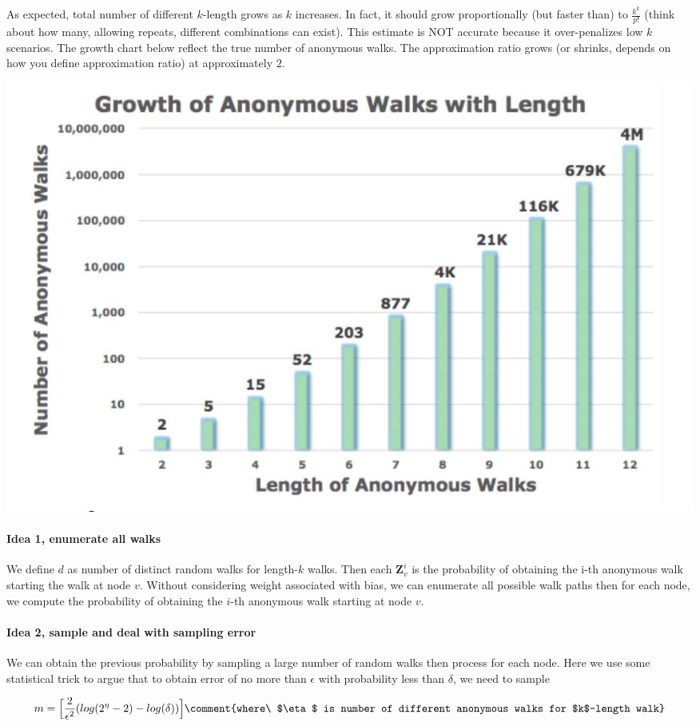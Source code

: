 As expected, total number of different $k$-length grows as $k$ increases. In fact, it should grow proportionally (but faster than) to $\frac{k^k}{p!}$ (think about how many, allowing repeats, different combinations can exist). This estimate is NOT accurate because it over-penalizes low $k$ scenarios. The growth chart below reflect the true number of anonymous walks. The approximation ratio grows (or shrinks, depends on how you define approximation ratio) at approximately $2$.

{
\centering
\includegraphics[width=0.55\linewidth]{notes/img/l7_p59_count.JPG} \par
}

\paragraph{Idea 1, enumerate all walks} We define $d$ as number of distinct random walks for length-$k$ walks. Then each $\mathbf{Z}_v^{i}$ is the probability of obtaining the i-th anonymous walk starting the walk at node $v$. Without considering weight associated with bias, we can enumerate all possible walk paths then for each node, we compute the probability of obtaining the $i$-th anonymous walk starting at node $v$.

\paragraph{Idea 2, sample and deal with sampling error} We can obtain the previous probability by sampling a large number of random walks then process for each node. Here we use some statistical trick to argue that to obtain error of no more than $\epsilon$ with probability less than $\delta$, we need to sample

\begin{align}
    m = \Big[\frac{2}{\epsilon^2}(log(2^\eta - 2) - log(\delta))\Big] \comment{where\ $\eta$ is number of different anonymous walks for $k$-length walk}
\end{align}{}

